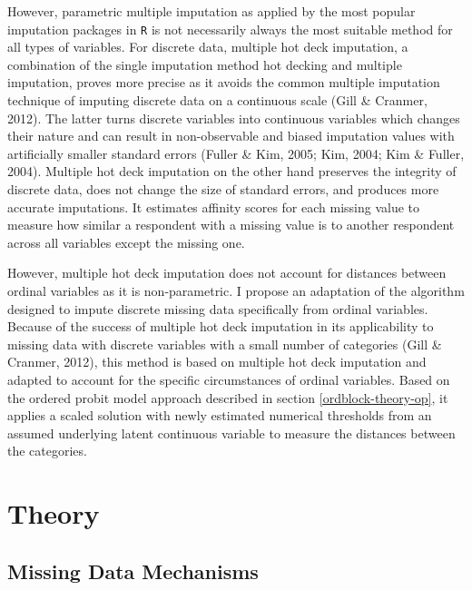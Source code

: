 \documentclass[12pt,econ]{sources/authesis}
\begin{document}
However, parametric multiple imputation as applied by the most popular imputation packages in \texttt{R} is not necessarily always the most suitable method for all types of variables. For discrete data, multiple hot deck imputation, a combination of the single imputation method hot decking and multiple imputation, proves more precise as it avoids the common multiple imputation technique of imputing discrete data on a continuous scale (Gill \& Cranmer, 2012). The latter turns discrete variables into continuous variables which changes their nature and can result in non-observable and biased imputation values with artificially smaller standard errors (Fuller \& Kim, 2005; Kim, 2004; Kim \& Fuller, 2004). Multiple hot deck imputation on the other hand preserves the integrity of discrete data, does not change the size of standard errors, and produces more accurate imputations. It estimates affinity scores for each missing value to measure how similar a respondent with a missing value is to another respondent across all variables except the missing one.

However, multiple hot deck imputation does not account for distances between ordinal variables as it is non-parametric. I propose an adaptation of the algorithm designed to impute discrete missing data specifically from ordinal variables. Because of the success of multiple hot deck imputation in its applicability to missing data with discrete variables with a small number of categories (Gill \& Cranmer, 2012), this method is based on multiple hot deck imputation and adapted to account for the specific circumstances of ordinal variables. Based on the ordered probit model approach described in section \ref{ordblock-theory-op}, it applies a scaled solution with newly estimated numerical thresholds from an assumed underlying latent continuous variable to measure the distances between the categories.

\hypertarget{ordmiss-theory}{%
\section{Theory}\label{ordmiss-theory}}

\hypertarget{ordmiss-theory-mechanisms}{%
\subsection{Missing Data Mechanisms}\label{ordmiss-theory-mechanisms}}
\end{document}

